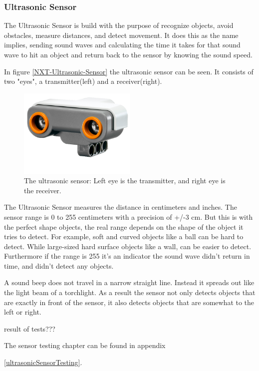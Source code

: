 \subsubsection{Ultrasonic Sensor} \label{Analysis:ultrasonicTests}
The Ultrasonic Sensor is build with the purpose of recognize objects, avoid obstacles, measure distances, and detect movement. It does this as the name implies, sending sound waves and calculating the time it takes for that sound wave to hit an object and return back to the sensor by knowing the sound speed.

In figure \ref{NXT-Ultrasonic-Sensor} the ultrasonic sensor can be seen. It consists of two "eyes", a transmitter(left) and a receiver(right)\cite{ExposedLEGOUltrasonic}. 

\begin{figure}[H]
    \centering
    \includegraphics[width=0.5\textwidth]{Images/Analysis/NXT-Ultrasonic-Sensor.png}
    \caption{The ultrasonic sensor: Left eye is the transmitter, and right eye is the receiver.}
    \label{fig:NXT-Ultrasonic-Sensor}
\end{figure}


The Ultrasonic Sensor measures the distance in centimeters and
inches. The sensor range is 0 to 255 centimeters with a precision of +/-3 cm. But this is with the perfect shape objects, the real range depends on the shape of the object it tries to detect. For example, soft and curved objects like a ball can be hard to detect. While large-sized hard surface  objects like a wall, can be easier to detect\cite{}. Furthermore if the range is 255 it's an indicator the sound wave didn't return in time, and didn't detect any objects.




A sound beep does not travel in a narrow straight line. Instead it spreads out like the light beam of a torchlight. As a result the sensor not only detects objects that are exactly in front of the sensor, it also detects objects that are somewhat to the left or right.







result of tests???



The sensor testing chapter can be found in appendix



\ref{ultrasonicSensorTesting}.
